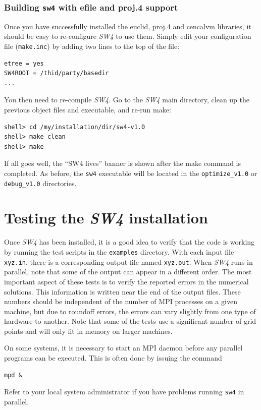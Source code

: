 \documentclass[11pt]{report}
\begin{document}
\subsection{Building {\tt sw4} with efile and proj.4 support}
Once you have successfully installed the euclid, proj.4 and cencalvm libraries, it should be easy to
re-configure \emph{SW4} to use them. Simply edit your configuration file (\verb+make.inc+)
by adding two lines to the top of the file:
\begin{verbatim}
etree = yes
SW4ROOT = /thid/party/basedir
...
\end{verbatim}
You then need to re-compile \emph{SW4}. Go to the \emph{SW4} main directory, clean up the previous object
files and executable, and re-run make:
\begin{verbatim}
shell> cd /my/installation/dir/sw4-v1.0
shell> make clean
shell> make
\end{verbatim}
If all goes well, the ``SW4 lives'' banner is shown after the make command is
completed. As before, the \verb+sw4+ executable will be located in the \verb+optimize_v1.0+ or
\verb+debug_v1.0+ directories.

\chapter{Testing the \emph{SW4} installation}\label{cha:testing-sw4}

Once \emph{SW4} has been installed, it is a good idea to verify that the code is working by running
the test scripts in the \verb+examples+ directory. With each input file \verb+xyz.in+, there is a
corresponding output file named \verb+xyz.out+. When \emph{SW4} runs in parallel, note that some of
the output can appear in a different order. The most important aspect of these tests is to verify
the reported errors in the numerical solutions. This information is written near the end of the
output files. These numbers should be independent of the number of MPI processes on a given machine,
but due to roundoff errors, the errors can vary slightly from one type of hardware to another. Note
that some of the tests use a significant number of grid points and will only fit in memory on larger
machines.

On some systems, it is necessary to start an MPI daemon before any parallel programs can be
executed. This is often done by issuing the command
\begin{verbatim}
mpd &
\end{verbatim}
Refer to your local system administrator if you have problems running \verb+sw4+ in parallel.
\end{document}
